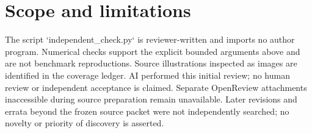 \documentclass[10pt]{article}
\begin{document}
\section*{Scope and limitations}
The script `independent\_check.py` is reviewer-written and imports no author program. Numerical checks support the explicit bounded arguments above and are not benchmark reproductions. Source illustrations inspected as images are identified in the coverage ledger. AI performed this initial review; no human review or independent acceptance is claimed. Separate OpenReview attachments inaccessible during source preparation remain unavailable. Later revisions and errata beyond the frozen source packet were not independently searched; no novelty or priority of discovery is asserted.\par
\end{document}
